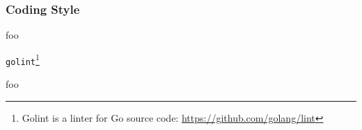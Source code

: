
\subsubsection{Coding Style}













foo

\texttt{golint}\footnote{Golint is a linter for Go source code: \url{https://github.com/golang/lint}}

%

foo
